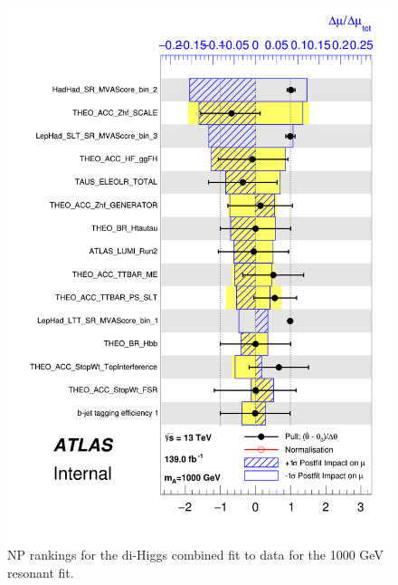 \begin{figure}
\centering
\includegraphics[width=.8\textwidth]{figures/results/HH/Combined/Rankings/rank_1000}
\caption{NP rankings for the di-Higgs combined fit to data for the 1000 GeV resonant fit.}
\label{fig:CombinedPostfitNPRankings2HDM1000}
\end{figure}

